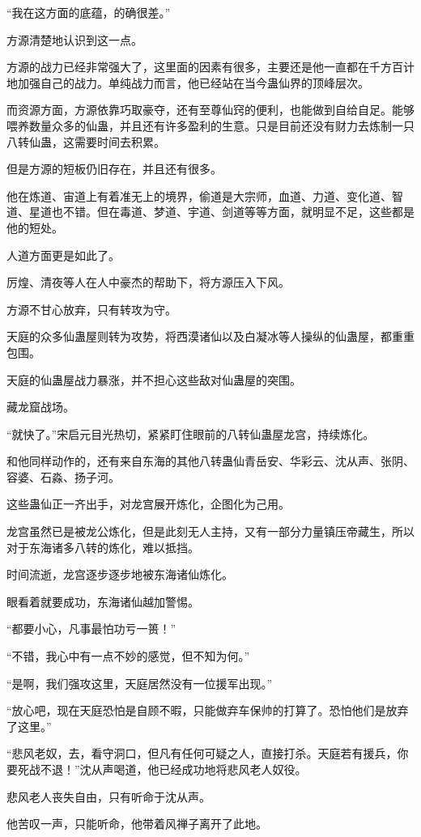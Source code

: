 \begin{this_body}
“我在这方面的底蕴，的确很差。”

方源清楚地认识到这一点。

方源的战力已经非常强大了，这里面的因素有很多，主要还是他一直都在千方百计地加强自己的战力。单纯战力而言，他已经站在当今蛊仙界的顶峰层次。

而资源方面，方源依靠巧取豪夺，还有至尊仙窍的便利，也能做到自给自足。能够喂养数量众多的仙蛊，并且还有许多盈利的生意。只是目前还没有财力去炼制一只八转仙蛊，这需要时间去积累。

但是方源的短板仍旧存在，并且还有很多。

他在炼道、宙道上有着准无上的境界，偷道是大宗师，血道、力道、变化道、智道、星道也不错。但在毒道、梦道、宇道、剑道等等方面，就明显不足，这些都是他的短处。

人道方面更是如此了。

厉煌、清夜等人在人中豪杰的帮助下，将方源压入下风。

方源不甘心放弃，只有转攻为守。

天庭的众多仙蛊屋则转为攻势，将西漠诸仙以及白凝冰等人操纵的仙蛊屋，都重重包围。

天庭的仙蛊屋战力暴涨，并不担心这些敌对仙蛊屋的突围。

藏龙窟战场。

“就快了。”宋启元目光热切，紧紧盯住眼前的八转仙蛊屋龙宫，持续炼化。

和他同样动作的，还有来自东海的其他八转蛊仙青岳安、华彩云、沈从声、张阴、容婆、石淼、扬子河。

这些蛊仙正一齐出手，对龙宫展开炼化，企图化为己用。

龙宫虽然已是被龙公炼化，但是此刻无人主持，又有一部分力量镇压帝藏生，所以对于东海诸多八转的炼化，难以抵挡。

时间流逝，龙宫逐步逐步地被东海诸仙炼化。

眼看着就要成功，东海诸仙越加警惕。

“都要小心，凡事最怕功亏一篑！”

“不错，我心中有一点不妙的感觉，但不知为何。”

“是啊，我们强攻这里，天庭居然没有一位援军出现。”

“放心吧，现在天庭恐怕是自顾不暇，只能做弃车保帅的打算了。恐怕他们是放弃了这里。”

“悲风老奴，去，看守洞口，但凡有任何可疑之人，直接打杀。天庭若有援兵，你要死战不退！”沈从声喝道，他已经成功地将悲风老人奴役。

悲风老人丧失自由，只有听命于沈从声。

他苦叹一声，只能听命，他带着风禅子离开了此地。


\end{this_body}
